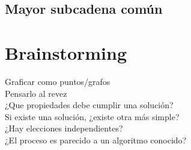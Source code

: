     \subsection{Mayor subcadena común}

\section{Brainstorming}
Graficar como puntos/grafos \\
Pensarlo al revez \\
¿Que propiedades debe cumplir una solución? \\
Si existe una solución, ¿existe otra más simple? \\
¿Hay elecciones independientes? \\
¿El proceso es parecido a un algoritmo conocido? \\

